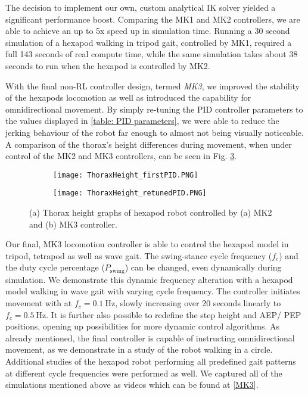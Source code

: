 The decision to implement our own, custom analytical IK solver yielded a significant performance boost.
Comparing the MK1 and MK2 controllers, we are able to achieve an up to 5x speed up in simulation time.
Running a 30 second simulation of a hexapod walking in tripod gait, controlled by MK1, required a full 143 seconds of real compute time, while the same simulation takes about 38 seconds to run when the hexapod is controlled by MK2.

With the final non-RL controller design, termed \textit{MK3}, we improved the stability of the hexapods locomotion as well as introduced the capability for omnidirectional movement.
By simply re-tuning the PID controller parameters to the values displayed in \ref{table: PID parameters}, we were able to reduce the jerking behaviour of the robot far enough to almost not being visually noticeable.
A comparison of the thorax's height differences during movement, when under control of the MK2 and MK3 controllers, can be seen in Fig. \ref{figure: Thorax height graphs}.


\begin{figure}[h]
	\begin{subfigure}{\textwidth} %
		\centering
		\texttt{[image: ThoraxHeight\_firstPID.PNG]}  %
		\caption{}
		\label{figure: Thorax Height graph, bad tuning}
	\end{subfigure}
	
	\begin{subfigure}{\textwidth}
		\centering
		\texttt{[image: ThoraxHeight\_retunedPID.PNG]}   %
		\caption{}
		\label{figure: Thorax height graph, re-tuning}
	\end{subfigure}
	\caption[Thorax Height Graphs]{(a) Thorax height graphs of hexapod robot controlled by (a) MK2 and (b) MK3 controller.}
	\label{figure: Thorax height graphs}
\end{figure}

Our final, MK3 locomotion controller is able to control the hexapod model in tripod, tetrapod as well as wave gait.
The swing-stance cycle frequency ($f_c$) and the duty cycle percentage ($P_\text{swing}$) can be changed, even dynamically during simulation.
We demonstrate this dynamic frequency alteration with a hexapod model walking in wave gait with varying cycle frequency.
The controller initiates movement with at $f_c = 0.1\ \text{Hz}$, slowly increasing over 20 seconds linearly to $f_c = 0.5\ \text{Hz}$. 
It is further also possible to redefine the step height and AEP/ PEP positions, opening up possibilities for more dynamic control algorithms.
As already mentioned, the final controller is capable of instructing omnidirectional movement, as we demonstrate in a study of the robot walking in a circle.
Additional studies of the hexapod robot performing all predefined gait patterns at different cycle frequencies were performed as well.
We captured all of the simulations mentioned above as videos which can be found at [\hyperref[vid: MK1]{MK3}].

